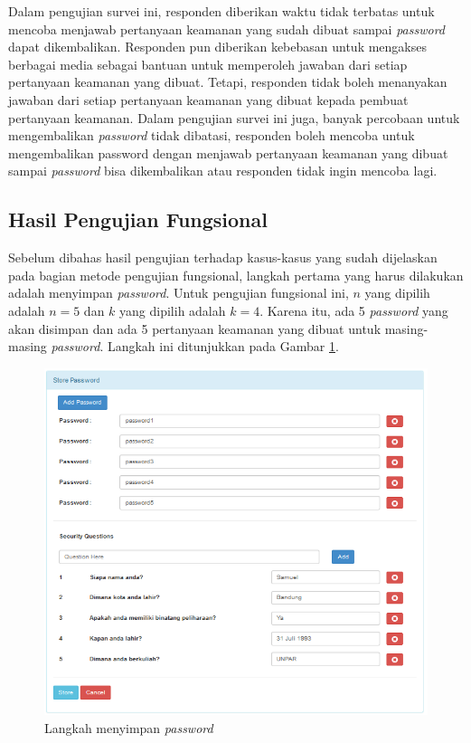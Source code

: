 Dalam pengujian survei ini, responden diberikan waktu tidak terbatas untuk mencoba menjawab pertanyaan keamanan yang sudah dibuat sampai \textit{password} dapat dikembalikan. Responden pun diberikan kebebasan untuk mengakses berbagai media sebagai bantuan untuk memperoleh jawaban dari setiap pertanyaan keamanan yang dibuat. Tetapi, responden tidak boleh menanyakan jawaban dari setiap pertanyaan keamanan yang dibuat kepada pembuat pertanyaan keamanan. Dalam pengujian survei ini juga, banyak percobaan untuk mengembalikan \textit{password} tidak dibatasi, responden boleh mencoba untuk mengembalikan password dengan menjawab pertanyaan keamanan yang dibuat sampai \textit{password} bisa dikembalikan atau responden tidak ingin mencoba lagi.

\subsection{Hasil Pengujian Fungsional}\label{subsec:hasil_pengujian_fungsional}

Sebelum dibahas hasil pengujian terhadap kasus-kasus yang sudah dijelaskan pada bagian metode pengujian fungsional, langkah pertama yang harus dilakukan adalah menyimpan \textit{password}. Untuk pengujian fungsional ini, $n$ yang dipilih adalah $n=5$ dan $k$ yang dipilih adalah $k=4$. Karena itu, ada 5 \textit{password} yang akan disimpan dan ada 5 pertanyaan keamanan yang dibuat untuk masing-masing \textit{password}. Langkah ini ditunjukkan pada Gambar \ref{fig:simpan_password}.

\begin{figure}[H]
	\includegraphics[scale=0.8]{Gambar/simpan_password}
	\centering
	\caption{Langkah menyimpan \textit{password}}\label{fig:simpan_password}
\end{figure}


